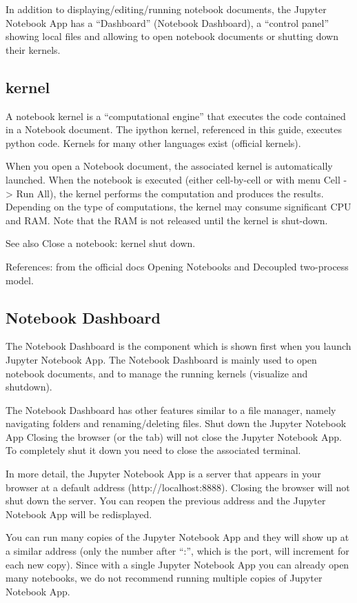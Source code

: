 In addition to displaying/editing/running notebook documents, the Jupyter Notebook App has a “Dashboard” (Notebook Dashboard), a “control panel” showing local files and allowing to open notebook documents or shutting down their kernels.

\subsection{kernel}
A notebook kernel is a “computational engine” that executes the code contained in a Notebook document. The ipython kernel, referenced in this guide, executes python code. Kernels for many other languages exist (official kernels).

When you open a Notebook document, the associated kernel is automatically launched. When the notebook is executed (either cell-by-cell or with menu Cell -> Run All), the kernel performs the computation and produces the results. Depending on the type of computations, the kernel may consume significant CPU and RAM. Note that the RAM is not released until the kernel is shut-down.

See also Close a notebook: kernel shut down.

References: from the official docs Opening Notebooks and Decoupled two-process model.

\subsection{Notebook Dashboard}
The Notebook Dashboard is the component which is shown first when you launch Jupyter Notebook App. The Notebook Dashboard is mainly used to open notebook documents, and to manage the running kernels (visualize and shutdown).

The Notebook Dashboard has other features similar to a file manager, namely navigating folders and renaming/deleting files.
Shut down the Jupyter Notebook App
Closing the browser (or the tab) will not close the Jupyter Notebook App. To completely shut it down you need to close the associated terminal.

In more detail, the Jupyter Notebook App is a server that appears in your browser at a default address (http://localhost:8888). Closing the browser will not shut down the server. You can reopen the previous address and the Jupyter Notebook App will be redisplayed.

You can run many copies of the Jupyter Notebook App and they will show up at a similar address (only the number after “:”, which is the port, will increment for each new copy). Since with a single Jupyter Notebook App you can already open many notebooks, we do not recommend running multiple copies of Jupyter Notebook App.

